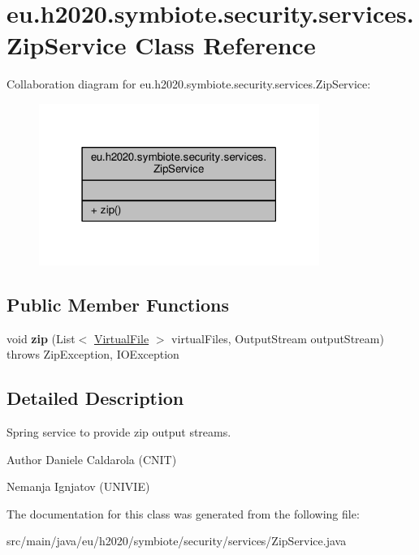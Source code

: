 \hypertarget{classeu_1_1h2020_1_1symbiote_1_1security_1_1services_1_1ZipService}{}\section{eu.\+h2020.\+symbiote.\+security.\+services.\+Zip\+Service Class Reference}
\label{classeu_1_1h2020_1_1symbiote_1_1security_1_1services_1_1ZipService}


Collaboration diagram for eu.\+h2020.\+symbiote.\+security.\+services.\+Zip\+Service\+:
\nopagebreak
\begin{figure}[H]
\begin{center}
\leavevmode
\includegraphics[width=259pt]{classeu_1_1h2020_1_1symbiote_1_1security_1_1services_1_1ZipService__coll__graph}
\end{center}
\end{figure}
\subsection*{Public Member Functions}
\begin{DoxyCompactItemize}
\item 
void {\bfseries zip} (List$<$ \hyperlink{classeu_1_1h2020_1_1symbiote_1_1security_1_1commons_1_1VirtualFile}{Virtual\+File} $>$ virtual\+Files, Output\+Stream output\+Stream)  throws Zip\+Exception, I\+O\+Exception \hypertarget{classeu_1_1h2020_1_1symbiote_1_1security_1_1services_1_1ZipService_ad1a60a49166495e1ee4524f5102edbf7}{}\label{classeu_1_1h2020_1_1symbiote_1_1security_1_1services_1_1ZipService_ad1a60a49166495e1ee4524f5102edbf7}

\end{DoxyCompactItemize}


\subsection{Detailed Description}
Spring service to provide zip output streams.

\begin{DoxyAuthor}{Author}
Daniele Caldarola (C\+N\+IT) 

Nemanja Ignjatov (U\+N\+I\+V\+IE) 
\end{DoxyAuthor}


The documentation for this class was generated from the following file\+:\begin{DoxyCompactItemize}
\item 
src/main/java/eu/h2020/symbiote/security/services/Zip\+Service.\+java\end{DoxyCompactItemize}
